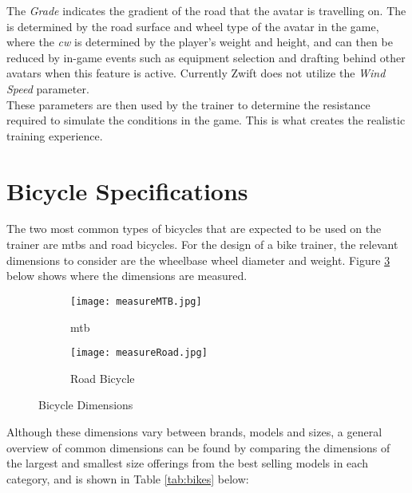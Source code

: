 The \textit{Grade} indicates the gradient of the road that the avatar is travelling on. The  is determined by the road surface and wheel type of the avatar in the game, where the \textit{\ac{cw}} is determined by the player's weight and height, and can then be reduced by in-game events such as equipment selection and drafting behind other avatars when this feature is active. Currently Zwift does not utilize the \textit{Wind Speed} parameter.\\
These parameters are then used by the trainer to determine the resistance required to simulate the conditions in the game. This is what creates the realistic training experience.

\newpage

\section{Bicycle Specifications}
The two most common types of bicycles that are expected to be used on the trainer are \acp{mtb} and road bicycles. For the design of a bike trainer, the relevant dimensions to consider are the wheelbase wheel diameter and weight. Figure \ref{fig:bikeDim} below shows where the dimensions are measured.

\begin{figure}[ht]
	\centering
	\begin{subfigure}{.5\textwidth}
		\centering
		\texttt{[image: measureMTB.jpg]}
		\caption{\ac{mtb} \citep[model by:][]{Pratama:2021}}
		\label{fig:sub1}
	\end{subfigure}%
	\begin{subfigure}{.5\textwidth}
		\centering
		\texttt{[image: measureRoad.jpg]}
		\caption{Road Bicycle \citep[model by:][]{Morozev:2017}}
		\label{fig:sub2}
	\end{subfigure}
	\caption{Bicycle Dimensions}
	\label{fig:bikeDim}
\end{figure}
Although these dimensions vary between brands, models and sizes, a general overview of common dimensions can be found by comparing the dimensions of the largest and smallest size offerings from the best selling models in each category, and is shown in Table \ref{tab:bikes} below: \citep{Lin:2021}

